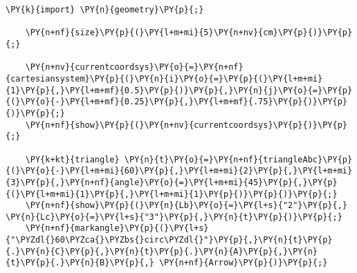 \begin{Verbatim}[commandchars=\\\{\}]
    \PY{k}{import} \PY{n}{geometry}\PY{p}{;}

    \PY{n+nf}{size}\PY{p}{(}\PY{l+m+mi}{5}\PY{n+nv}{cm}\PY{p}{)}\PY{p}{;}

    \PY{n+nv}{currentcoordsys}\PY{o}{=}\PY{n+nf}{cartesiansystem}\PY{p}{(}\PY{n}{i}\PY{o}{=}\PY{p}{(}\PY{l+m+mi}{1}\PY{p}{,}\PY{l+m+mf}{0.5}\PY{p}{)}\PY{p}{,}\PY{n}{j}\PY{o}{=}\PY{p}{(}\PY{o}{-}\PY{l+m+mf}{0.25}\PY{p}{,}\PY{l+m+mf}{.75}\PY{p}{)}\PY{p}{)}\PY{p}{;}
    \PY{n+nf}{show}\PY{p}{(}\PY{n+nv}{currentcoordsys}\PY{p}{)}\PY{p}{;}

    \PY{k+kt}{triangle} \PY{n}{t}\PY{o}{=}\PY{n+nf}{triangleAbc}\PY{p}{(}\PY{o}{-}\PY{l+m+mi}{60}\PY{p}{,}\PY{l+m+mi}{2}\PY{p}{,}\PY{l+m+mi}{3}\PY{p}{,}\PY{n+nf}{angle}\PY{o}{=}\PY{l+m+mi}{45}\PY{p}{,}\PY{p}{(}\PY{l+m+mi}{1}\PY{p}{,}\PY{l+m+mi}{1}\PY{p}{)}\PY{p}{)}\PY{p}{;}
    \PY{n+nf}{show}\PY{p}{(}\PY{n}{Lb}\PY{o}{=}\PY{l+s}{"2"}\PY{p}{,} \PY{n}{Lc}\PY{o}{=}\PY{l+s}{"3"}\PY{p}{,}\PY{n}{t}\PY{p}{)}\PY{p}{;}
    \PY{n+nf}{markangle}\PY{p}{(}\PY{l+s}{"\PYZdl{}60\PYZca{}\PYZbs{}circ\PYZdl{}"}\PY{p}{,}\PY{n}{t}\PY{p}{.}\PY{n}{C}\PY{p}{,}\PY{n}{t}\PY{p}{.}\PY{n}{A}\PY{p}{,}\PY{n}{t}\PY{p}{.}\PY{n}{B}\PY{p}{,} \PY{n+nf}{Arrow}\PY{p}{)}\PY{p}{;}
\end{Verbatim}
